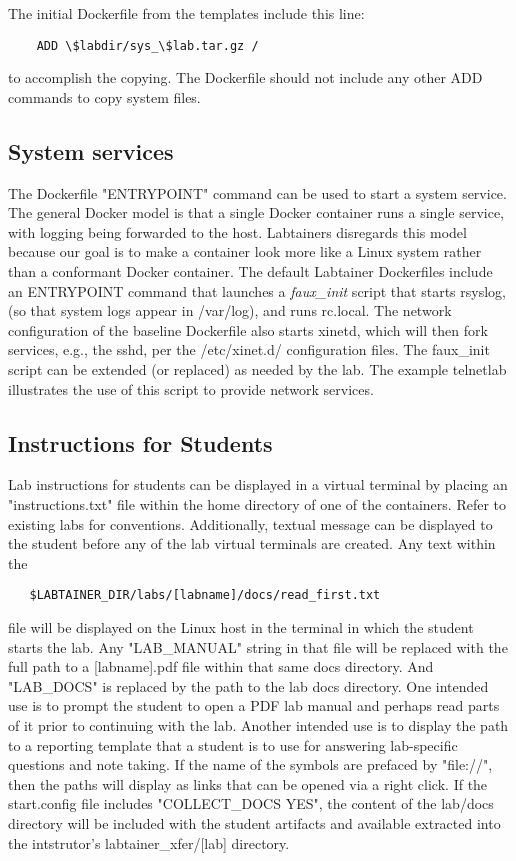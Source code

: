 \documentclass[12pt]{article}
\begin{document}
The initial Dockerfile from the templates include this line:
\begin{verbatim}
    ADD \$labdir/sys_\$lab.tar.gz /
\end{verbatim}
to accomplish the copying. The Dockerfile should not include any other ADD commands
to copy system files.

\subsection {System services}
The Dockerfile "ENTRYPOINT" command can be used to start a system service.  The general Docker 
model is that a single Docker container runs a single service, with logging being forwarded to 
the host.  Labtainers disregards this model because our goal is to make a container look more like a Linux
system rather than a conformant Docker container.  The default Labtainer Dockerfiles include an
ENTRYPOINT command that launches a \textit{faux\_init} script that starts rsyslog, (so that system logs
appear in /var/log), and runs rc.local.  The network configuration of the baseline Dockerfile also starts xinetd,
which will then fork services, e.g., the sshd, per the /etc/xinet.d/ configuration files.  The faux\_init script
can be extended (or replaced) as needed by the lab.  The example telnetlab illustrates the use of this script
to provide network services.

\subsection {Instructions for Students} \label{instructions}
Lab instructions for students can be displayed in a virtual terminal by placing an
"instructions.txt" file within the home directory of one of the containers.  Refer to existing
labs for conventions.  Additionally, textual message can be displayed to the student before any 
of the lab virtual terminals are created.  Any text within the 
\begin{verbatim}
   $LABTAINER_DIR/labs/[labname]/docs/read_first.txt
\end{verbatim}
\noindent file will be displayed on the Linux host in the terminal in which the student
starts the lab.  Any "LAB\_MANUAL" string in that file will be replaced with the full path
to a [labname].pdf file within that same docs directory.  And "LAB\_DOCS" is replaced by the
path to the lab docs directory.  One intended use is to prompt the
student to open a PDF lab manual and perhaps read parts of it prior to continuing with the lab.
Another intended use is to display the path to a reporting template that a student is to use
for answering lab-specific questions and note taking.  If the name of the symbols are prefaced
by "file://", then the paths will display as links that can be opened via a right click.
If the start.config file includes "COLLECT\_DOCS YES", the content of the lab/docs directory will be
included with the student artifacts and available extracted into the intstrutor's labtainer\_xfer/[lab]
directory.
\end{document}

